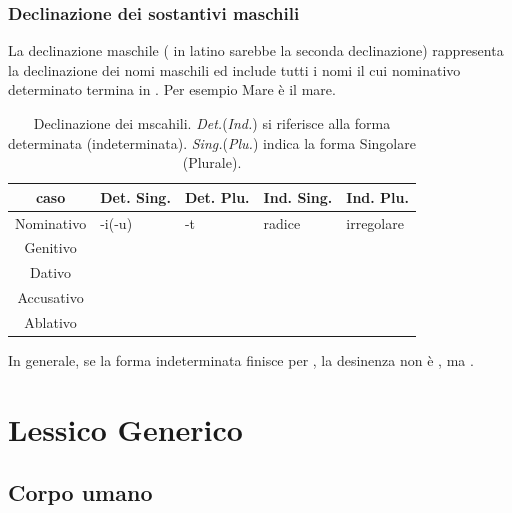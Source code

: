 \subsection{Declinazione dei sostantivi maschili}

La declinazione maschile (\ie{} in latino sarebbe la seconda declinazione) rappresenta la declinazione dei nomi maschili ed include tutti i nomi il cui nominativo determinato termina in . Per esempio \glsdesc{Mare} è il mare.

\begin{table}[H]
    \centering
    \begin{tabular}{cllll}
        \toprule
        caso        & Det. Sing.    & Det. Plu. & Ind. Sing.    & Ind. Plu. \\
        \midrule
        Nominativo  & -i(-u)          & -t      & radice               & irregolare \\
        Genitivo    & & & & \\
        Dativo      & & & & \\
        Accusativo  & & & & \\
        Ablativo    & & & & \\
        \bottomrule
    \end{tabular}
    \caption{Declinazione dei mscahili. \textit{Det.}(\textit{Ind.}) si riferisce alla forma determinata (indeterminata). \textit{Sing.}(\textit{Plu.}) indica la forma Singolare (Plurale).}
\end{table}

In generale, se la forma indeterminata finisce per , la desinenza non è , ma .

\chapter{Lessico Generico}

\section{Corpo umano}

